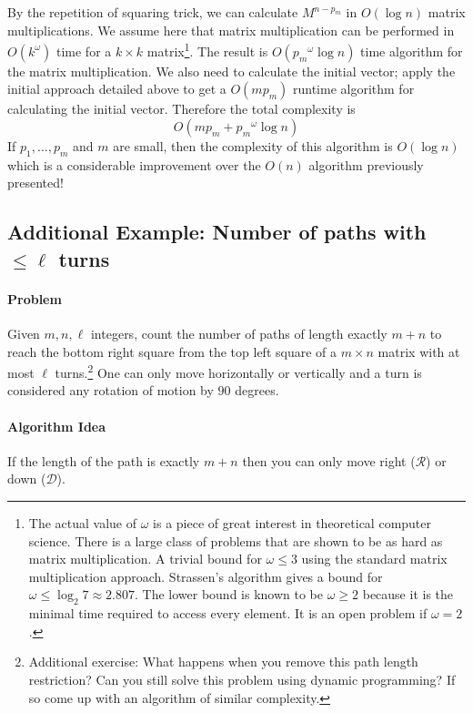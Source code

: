 \documentclass[10pt]{article}
\theoremstyle{plain}
\theoremstyle{definition}
\numberwithin{equation}{section}
\numberwithin{figure}{section}
\begin{document}
By the repetition of squaring trick, we can calculate $M^{n - p_m}$ in $O(\log n)$ matrix multiplications. We assume here that matrix multiplication can be performed in $O(k^\omega)$ time for a $k \times k$ matrix\footnote{The actual value of $\omega$ is a piece of great interest in theoretical computer science. There is a large class of problems that are shown to be as hard as matrix multiplication. A trivial bound for $\omega \leq 3$ using the standard matrix multiplication approach. Strassen's algorithm gives a bound for $\omega \leq \log_2 7 \approx 2.807$. The lower bound is known to be $\omega \geq 2$ because it is the minimal time required to access every element. It is an open problem if $\omega = 2$.}. The result is $O({p_m}^\omega \log n)$ time algorithm for the matrix multiplication. We also need to calculate the initial vector; apply the initial approach detailed above to get a $O(m p_m)$ runtime algorithm for calculating the initial vector. Therefore the total complexity is
\begin{equation}
O \left(m p_m + {p_m}^\omega \log n \right)
\end{equation}
If $p_1, \ldots, p_m$ and $m$ are small, then the complexity of this algorithm is $O(\log n)$ which is a considerable improvement over the $O(n)$ algorithm previously presented!

\subsection{Additional Example: Number of paths with $\leq \ell$ turns}

\paragraph{Problem} Given $m, n, \ell$ integers, count the number of paths of length exactly $m + n$ to reach the bottom right square from the top left square of a $m \times n$ matrix with at most $\ell$ turns.\footnote{Additional exercise: What happens when you remove this path length restriction? Can you still solve this problem using dynamic programming? If so come up with an algorithm of similar complexity.} One can only move horizontally or vertically and a turn is considered any rotation of motion by $90$ degrees.

\paragraph{Algorithm Idea} If the length of the path is exactly $m + n$ then you can only move right ($\mathcal{R}$) or down ($\mathcal{D}$). \\
\end{document}
